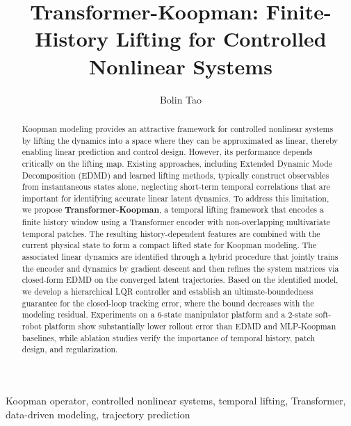 \documentclass[journal]{IEEEtran}
\begin{document}
\title{Transformer-Koopman: Finite-History Lifting for Controlled Nonlinear Systems}

\author{Bolin Tao}


\maketitle

\begin{abstract}
Koopman modeling provides an attractive framework for controlled nonlinear systems by lifting the dynamics into a space where they can be approximated as linear, thereby enabling linear prediction and control design. However, its performance depends critically on the lifting map. Existing approaches, including Extended Dynamic Mode Decomposition (EDMD) and learned lifting methods, typically construct observables from instantaneous states alone, neglecting short-term temporal correlations that are important for identifying accurate linear latent dynamics. To address this limitation, we propose \textbf{Transformer-Koopman}, a temporal lifting framework that encodes a finite history window using a Transformer encoder with non-overlapping multivariate temporal patches. The resulting history-dependent features are combined with the current physical state to form a compact lifted state for Koopman modeling. The associated linear dynamics are identified through a hybrid procedure that jointly trains the encoder and dynamics by gradient descent and then refines the system matrices via closed-form EDMD on the converged latent trajectories. Based on the identified model, we develop a hierarchical LQR controller and establish an ultimate-boundedness guarantee for the closed-loop tracking error, where the bound decreases with the modeling residual. Experiments on a 6-state manipulator platform and a 2-state soft-robot platform show substantially lower rollout error than EDMD and MLP-Koopman baselines, while ablation studies verify the importance of temporal history, patch design, and regularization.
\end{abstract}

\begin{IEEEkeywords}
Koopman operator, controlled nonlinear systems, temporal lifting, Transformer, data-driven modeling, trajectory prediction
\end{IEEEkeywords}

\end{document}

